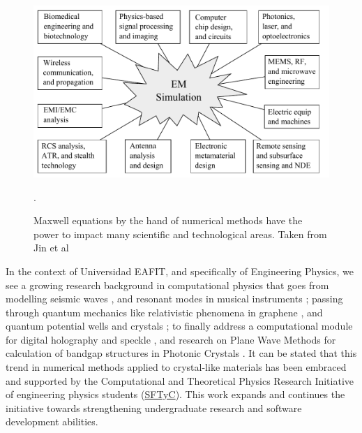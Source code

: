 \begin{figure}[h]
\centering
\includegraphics[scale=0.5]{./img/EM_simulation_applications.pdf}
\caption{Maxwell equations by the hand of numerical methods have the power to impact many scientific and technological areas. Taken from Jin et al \cite{Jin2010}}.
\label{fig:simulation_areas}
\end{figure}

In the context of Universidad EAFIT, and specifically of Engineering Physics, we see a growing research background in computational physics that goes from modelling seismic waves \cite{Guarin2012}, and resonant modes in musical instruments \cite{Rodriguez2012}; passing through quantum mechanics like relativistic phenomena in graphene \cite{Villegas2011}, and quantum potential wells and crystals \cite{Echeverri2011}; to finally address a computational module for digital holography and speckle \cite{Sierra2010}, and research on Plane Wave Methods for calculation of bandgap structures in Photonic Crystals \cite{Loaiza2011}. It can be stated that this trend in numerical methods applied to crystal-like materials has been embraced and supported by the Computational and Theoretical Physics Research Initiative of engineering physics students (\href{https://sites.google.com/site/fisicatyc/home}{SFTyC}). This work expands and continues the initiative towards strengthening undergraduate research and software development abilities. 

\pagebreak